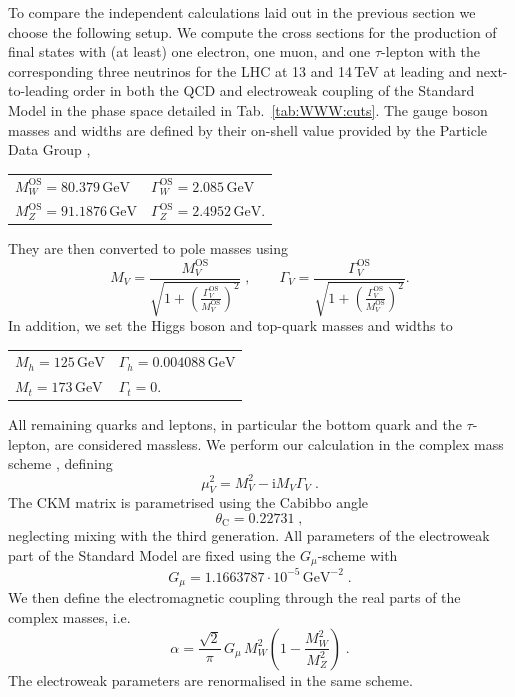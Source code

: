 To compare the independent
calculations laid out in the previous section we 
choose the following setup.
We compute the cross sections for the production of
final states with (at least) one electron, one muon, and one
$\tau$-lepton with the corresponding three neutrinos for the
LHC at 13 and 14\,TeV at leading and next-to-leading order
in both the QCD and electroweak coupling of the Standard Model
in the phase space detailed in 
Tab.~\ref{tab:WWW:cuts}.
The gauge boson masses and widths are defined by their on-shell 
value provided by the Particle Data Group \cite{Tanabashi:2018oca}, 
\begin{center}
  \begin{tabular}{ll}
    $M_W^\text{OS}=80.379\,\text{GeV}$\qquad & $\Gamma_W^\text{OS}=2.085\,\text{GeV}$ \\
    $M_Z^\text{OS}=91.1876\,\text{GeV}$\qquad & $\Gamma_Z^\text{OS}=2.4952\,\text{GeV}$.
  \end{tabular}
\end{center}
They are then converted to pole masses using 
\begin{equation}
  M_V=\frac{M_V^\text{OS}}{\sqrt{1+\left(\frac{\Gamma_V^\text{OS}}{M_V^\text{OS}}\right)^2}}\;,
  \qquad
  \Gamma_V=\frac{\Gamma_V^\text{OS}}{\sqrt{1+\left(\frac{\Gamma_V^\text{OS}}{M_V^\text{OS}}\right)^2}}.
\end{equation}
In addition, we set the Higgs boson and top-quark masses
and widths to 
\begin{center}
  \begin{tabular}{ll}
    $M_h=125\,\text{GeV}$ & $\Gamma_h=0.004088\,\text{GeV}$ \\
    $M_t=173\,\text{GeV}$ & $\Gamma_t=0$\;. \\
  \end{tabular}
\end{center}
All remaining quarks and leptons, in particular the bottom quark and the $\tau$-lepton,
are considered massless.
We perform our calculation in the complex mass scheme 
\cite{Denner:2005fg,Denner:2014zga},
defining
\begin{equation}
  \mu_V^2=M_V^2-\mathrm{i}M_V\Gamma_V\;.
\end{equation}
The CKM matrix is parametrised using the Cabibbo angle 
\begin{equation}
  \theta_\text{C}=0.22731\;,\nonumber
\end{equation}
neglecting mixing with the third generation. 
All parameters of the electroweak part of the Standard Model 
are fixed using the $G_\mu$-scheme \cite{Dittmaier:2001ay} with
\begin{equation}
  G_\mu=1.1663787\cdot 10^{-5}\,\text{GeV}^{-2}\;.\nonumber
\end{equation}
We then define the electromagnetic coupling through the 
real parts of the complex masses, i.e.\
\begin{equation}
  \alpha=\frac{\sqrt{2}}{\pi}\,G_\mu\,M_W^2\left(1-\frac{M_W^2}{M_Z^2}\right)\;.
\end{equation}
The electroweak parameters are renormalised in the same scheme.

